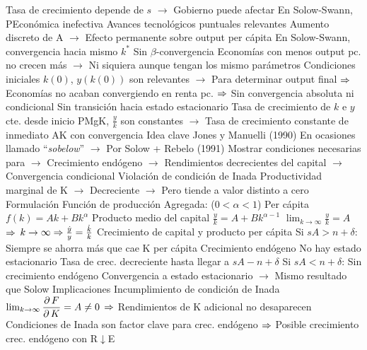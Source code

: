 \documentclass{nuevotema}
\begin{document}
\begin{esquemal}
				\4[] Tasa de crecimiento depende de $s$
				\4[] $\to$ Gobierno puede afectar
				\4[] En Solow-Swann, PEconómica inefectiva
				\4 Avances tecnológicos puntuales relevantes
				\4[] Aumento discreto de A
				\4[] $\to$ Efecto permanente sobre output per cápita
				\4[] En Solow-Swann, convergencia hacia mismo $k^*$
				\4 Sin $\beta$-convergencia
				\4[] Economías con menos output pc. no crecen más
				\4[] $\to$ Ni siquiera aunque tengan los mismo parámetros
				\4[] Condiciones iniciales $k(0)$, $y(k(0))$ son relevantes
				\4[] $\to$ Para determinar output final
				\4[] $\Rightarrow$ Economías no acaban convergiendo en renta pc.
				\4[] $\Rightarrow$ Sin convergencia absoluta ni condicional
				\4 Sin transición hacia estado estacionario
				\4[] Tasa de crecimiento de $k$ e $y$ cte. desde inicio
				\4[] PMgK, $\frac{y}{k}$ son constantes
				\4[] $\to$ Tasa de crecimiento constante de inmediato
		\2 AK con convergencia
			\3 Idea clave
				\4 Jones y Manuelli (1990)
				\4[] En ocasiones llamado ``\textit{sobelow}''
				\4[] $\to$ Por Solow + Rebelo (1991)
				\4 Mostrar condiciones necesarias para
				\4[] $\to$ Crecimiento endógeno
				\4[] $\to$ Rendimientos decrecientes del capital
				\4[] $\to$ Convergencia condicional
				\4 Violación de condición de Inada
				\4[] Productividad marginal de K
				\4[] $\to$ Decreciente
				\4[] $\to$ Pero tiende a valor distinto a cero
			\3 Formulación
				\4 Función de producción
				\4[] Agregada:
				\4[]  \quad ($0 < \alpha < 1$)
				\4[] Per cápita
				\4[] $f(k) = Ak + Bk^\alpha$
				\4 Producto medio del capital
				\4[] $\frac{y}{k} = A + Bk^{\alpha-1}$
				\4[] $\lim_{k\to \infty}\frac{y}{k} = A$
				\4[] $\Rightarrow$ $k \to \infty \Rightarrow \frac{\dot{y}}{y} = \frac{\dot{k}}{k}$
				\4 Crecimiento de capital y producto per cápita
				\4[] 
				\4 Si $sA > n+\delta$:
				\4[] Siempre se ahorra más que cae K per cápita
				\4[] Crecimiento endógeno
				\4[] No hay estado estacionario
				\4[] Tasa de crec. decreciente hasta llegar a $sA-n+\delta$
				\4[] 
				\4 Si $sA < n+\delta$:
				\4[] Sin crecimiento endógeno
				\4[] Convergencia a estado estacionario
				\4[] $\to$ Mismo resultado que Solow
			\3 Implicaciones
				\4 Incumplimiento de condición de Inada
				\4[] $ \lim_{k \to \infty} \dfrac{\partial \, F}{\partial \, K} = A \neq 0$
				\4[] $\Rightarrow$ Rendimientos de K adicional no desaparecen
				\4[] Condiciones de Inada son factor clave para crec. endógeno
				\4[] $\Rightarrow$ Posible crecimiento crec. endógeno con R$\downarrow$E

\end{esquemal}
\end{document}
